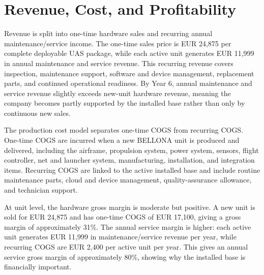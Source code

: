 \section{Revenue, Cost, and Profitability}

Revenue is split into one-time hardware sales and recurring annual maintenance/service income. The one-time sales price is EUR 24,875 per complete deployable UAS package, while each active unit generates EUR 11,999 in annual maintenance and service revenue. This recurring revenue covers inspection, maintenance support, software and device management, replacement parts, and continued operational readiness. By Year 6, annual maintenance and service revenue slightly exceeds new-unit hardware revenue, meaning the company becomes partly supported by the installed base rather than only by continuous new sales.


The production cost model separates one-time COGS from recurring COGS. One-time COGS are incurred when a new BELLONA unit is produced and delivered, including the airframe, propulsion system, power system, sensors, flight controller, net and launcher system, manufacturing, installation, and integration items. Recurring COGS are linked to the active installed base and include routine maintenance parts, cloud and device management, quality-assurance allowance, and technician support.

At unit level, the hardware gross margin is moderate but positive. A new unit is sold for EUR 24,875 and has one-time COGS of EUR 17,100, giving a gross margin of approximately 31\%. The annual service margin is higher: each active unit generates EUR 11,999 in maintenance/service revenue per year, while recurring COGS are EUR 2,400 per active unit per year. This gives an annual service gross margin of approximately 80\%, showing why the installed base is financially important.


